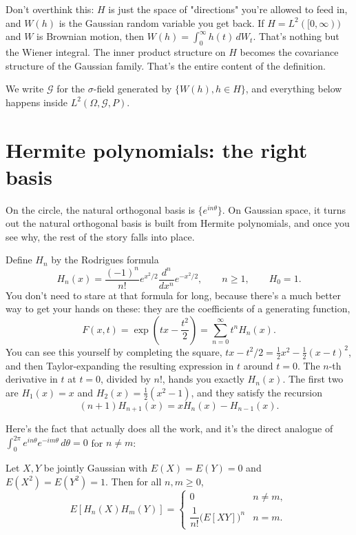 Don't overthink this: $H$ is just the space of "directions" you're allowed to feed in, and $W(h)$ is the Gaussian random variable you get back. If $H = L^2([0,\infty))$ and $W$ is Brownian motion, then $W(h) = \int_0^\infty h(t)\,dW_t$. That's nothing but the Wiener integral. The inner product structure on $H$ becomes the covariance structure of the Gaussian family. That's the entire content of the definition.

We write $\mathcal G$ for the $\sigma$-field generated by $\{W(h), h \in H\}$, and everything below happens inside $L^2(\Omega, \mathcal G, P)$.

\section{Hermite polynomials: the right basis}

On the circle, the natural orthogonal basis is $\{e^{in\theta}\}$. On Gaussian space, it turns out the natural orthogonal basis is built from Hermite polynomials, and once you see why, the rest of the story falls into place.

Define $H_n$ by the Rodrigues formula
$$
H_n(x) = \frac{(-1)^n}{n!} e^{x^2/2} \frac{d^n}{dx^n} e^{-x^2/2}, \qquad n \ge 1, \qquad H_0 = 1.
$$
You don't need to stare at that formula for long, because there's a much better way to get your hands on these: they are the coefficients of a generating function,
$$
F(x,t) = \exp\!\left(tx - \frac{t^2}{2}\right) = \sum_{n=0}^\infty t^n H_n(x).
$$
You can see this yourself by completing the square, $tx - t^2/2 = \tfrac12 x^2 - \tfrac12(x-t)^2$, and then Taylor-expanding the resulting expression in $t$ around $t = 0$. The $n$-th derivative in $t$ at $t=0$, divided by $n!$, hands you exactly $H_n(x)$. The first two are $H_1(x) = x$ and $H_2(x) = \tfrac12(x^2 - 1)$, and they satisfy the recursion
$$
(n+1)H_{n+1}(x) = xH_n(x) - H_{n-1}(x).
$$

Here's the fact that actually does all the work, and it's the direct analogue of $\int_0^{2\pi} e^{in\theta} e^{-im\theta}\, d\theta = 0$ for $n \ne m$:

\begin{lemma}
Let $X, Y$ be jointly Gaussian with $E(X) = E(Y) = 0$ and $E(X^2) = E(Y^2) = 1$. Then for all $n, m \ge 0$,
$$
E[H_n(X)H_m(Y)] =
\begin{cases}
0 & n \ne m, \\[4pt]
\dfrac{1}{n!}\big(E[XY]\big)^n & n = m.
\end{cases}
$$
\end{lemma}

